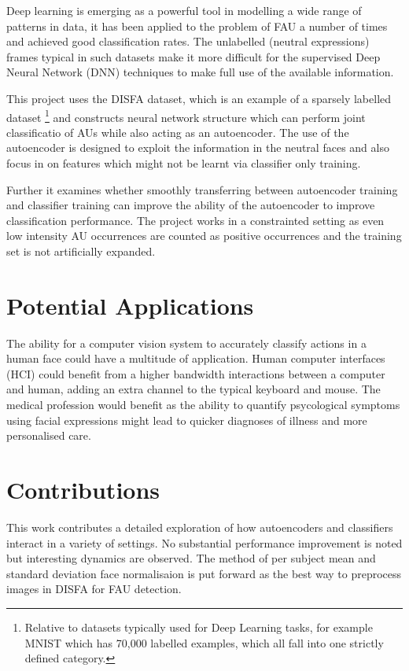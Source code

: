   Deep learning is emerging as a powerful tool in modelling a wide range of patterns
  in data, it has been applied to the problem of FAU a number of times and achieved
  good classification rates. The unlabelled (neutral expressions) frames typical
  in such datasets make it more difficult for the supervised
  Deep Neural Network (DNN) techniques to make full use of the available information.

  This project uses the DISFA dataset, which is an example of a sparsely labelled dataset
  \footnote{Relative to datasets typically used for
            Deep Learning tasks, for example MNIST\cite{mnist}
            which has 70,000 labelled examples, which all fall
            into one strictly defined category.} and constructs neural network structure which
  can perform joint classificatio of AUs while also acting as an autoencoder.
  The use of the autoencoder is designed to exploit the information in the neutral faces
  and also focus in on features which might not be learnt via classifier only training.

  Further it examines whether
  smoothly transferring between autoencoder training and classifier training can improve
  the ability of the autoencoder to improve classification performance. The project works in a constrainted setting as
  even low intensity AU occurrences are counted as positive occurrences and the training set
  is not artificially expanded.

  \section{Potential Applications}
    The ability for a computer vision system to accurately classify actions in a
    human face could have a multitude of application. Human computer interfaces (HCI)
    could benefit from a higher bandwidth interactions between a computer and human, adding
    an extra channel to the typical keyboard and mouse. The medical profession would benefit
    as the ability to quantify psycological symptoms using facial expressions might lead to
    quicker diagnoses of illness and more personalised care.

  \section{Contributions}
    This work contributes a detailed exploration of how autoencoders and classifiers
    interact in a variety of settings. No substantial performance improvement is noted
    but interesting dynamics are observed. The method of per subject mean and standard
    deviation face normalisaion is put forward as the best way to preprocess images in DISFA
    for FAU detection.

